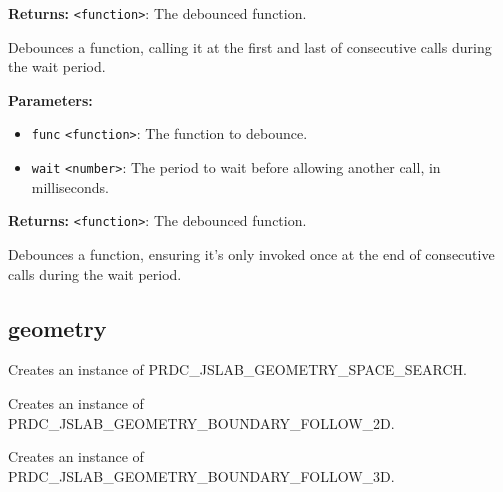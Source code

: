 \documentclass[12pt,a4paper]{article}
\begin{document}
\noindent \textbf{Returns:} \texttt{<function>}: The debounced function.

\noindent Debounces a function, calling it at the first and last of consecutive calls during the wait period.

\vspace{5mm}
\noindent {}


\noindent \textbf{Parameters:}
\begin{itemize}
  \item \texttt{func} \texttt{<function>}: The function to debounce.
  \item \texttt{wait} \texttt{<number>}: The period to wait before allowing another call, in milliseconds.
\end{itemize}

\noindent \textbf{Returns:} \texttt{<function>}: The debounced function.

\noindent Debounces a function, ensuring it's only invoked once at the end of consecutive calls during the wait period.


\subsection{geometry}
\vspace{5mm}
\noindent {}


\noindent Creates an instance of PRDC\_JSLAB\_GEOMETRY\_SPACE\_SEARCH.

\vspace{5mm}
\noindent {}


\noindent Creates an instance of PRDC\_JSLAB\_GEOMETRY\_BOUNDARY\_FOLLOW\_2D.

\vspace{5mm}
\noindent {}


\noindent Creates an instance of PRDC\_JSLAB\_GEOMETRY\_BOUNDARY\_FOLLOW\_3D.
\end{document}
